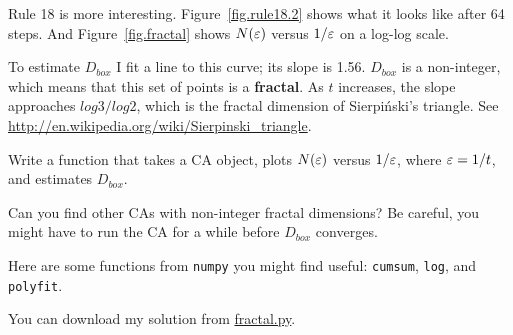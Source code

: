 \documentclass[10pt]{book}
\begin{document}
Rule 18 is more interesting.  Figure~\ref{fig.rule18.2} shows what it
looks like after 64 steps.  And Figure~\ref{fig.fractal} shows
$N(\varepsilon)$ versus $1/\varepsilon$ on a log-log scale.  

To estimate $D_{box}$ I fit a line to this curve; its slope is 1.56.
$D_{box}$ is a non-integer, which means that this set of
points is a {\bf fractal}.  As $t$ increases, the slope approaches
$log 3 / log 2$, which is the fractal dimension of Sierpi\'{n}ski's
triangle.  See \url{http://en.wikipedia.org/wiki/Sierpinski_triangle}.

\begin{exercise}

Write a function that takes a CA object, plots $N(\varepsilon)$ versus
$1/\varepsilon$, where $\varepsilon = 1/t$, and estimates $D_{box}$.

Can you find other CAs with non-integer fractal dimensions?  Be
careful, you might have to run the CA for a while before
$D_{box}$ converges.

Here are some functions from {\tt numpy} you might find useful:
{\tt cumsum}, {\tt log}, and {\tt polyfit}.

You can download my solution from \url{fractal.py}.

\end{exercise}
\end{document}
